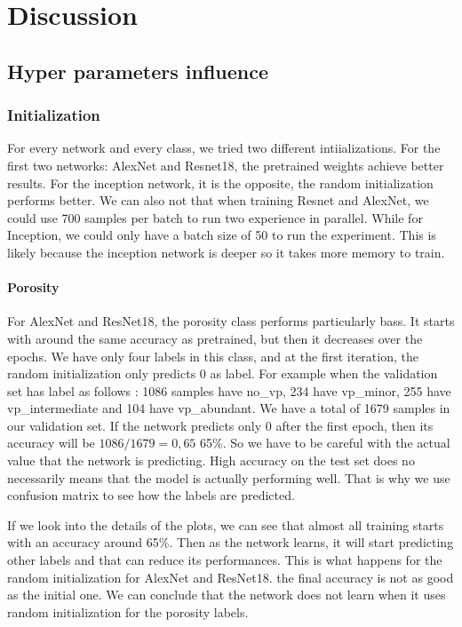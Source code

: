 \chapter{Discussion}\label{chp:discussion}
\section{Hyper parameters influence}
\subsection{Initialization}
For every network and every class, we tried two different intiializations. For the first two networks: AlexNet and Resnet18, the pretrained weights achieve better results. For the inception network, it is the opposite, the random initialization performs better. 
We can also not that when training Resnet and AlexNet, we could use 700 samples per batch to run two experience in parallel. While for Inception, we could only have a batch size of 50 to run the experiment. This is likely because the inception network is deeper so it takes more memory to train.

\subsubsection{Porosity}
For AlexNet and ResNet18, the porosity class performs particularly bass. It starts with around the same accuracy as pretrained, but then it decreases over the epochs. We have only four labels in this class, and at the first iteration, the random initialization only predicts 0 as label. 
For example when the validation set has label as follows : 1086 samples have no\_vp, 234 have vp\_minor, 255 have vp\_intermediate and 104 have vp\_abundant. We have a total of 1679 samples in our validation set. If the network predicts only 0 after the first epoch, then its accuracy will be \(1086/1679 = 0,65\) 65\%. So we have to be careful with the actual value that the network is predicting.  High accuracy on the test set does no necessarily means that the model is actually performing well. That is why we use confusion matrix to see how the labels are predicted.

If we look into the details of the plots, we can see that almost all training starts with an accuracy around 65\%. Then as the network learns, it will start predicting other labels and that can reduce its performances. This is what happens for the random initialization for AlexNet and ResNet18. the final accuracy is not as good as the initial one. We can conclude that the network does not learn when it uses random initialization for the porosity labels.

